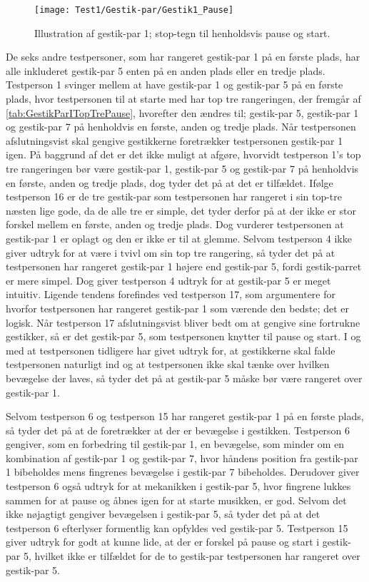 %
\begin{figure}[H]
	\centering
	\texttt{[image: Test1/Gestik-par/Gestik1\_Pause]}
	\caption{Illustration af gestik-par 1; stop-tegn til henholdsvis pause og start.}
	\label{fig:GestikPar1Pause}
\end{figure}
\noindent
% 	 
De seks andre testpersoner, som har rangeret gestik-par 1 på en første plads, har alle inkluderet gestik-par 5 enten på en anden plads eller en tredje plads. Testperson 1 svinger mellem at have gestik-par 1 og gestik-par 5 på en første plads, hvor testpersonen til at starte med har top tre rangeringen, der fremgår af \autoref{tab:GestikParITopTrePause}, hvorefter den ændres til; gestik-par 5, gestik-par 1 og gestik-par 7 på henholdvis en første, anden og tredje plads. Når testpersonen afslutningsvist skal gengive gestikkerne foretrækker testpersonen gestik-par 1 igen. På baggrund af det er det ikke muligt at afgøre, hvorvidt testperson 1's top tre rangeringen bør være gestik-par 1, gestik-par 5 og gestik-par 7 på henholdvis en første, anden og tredje plads, dog tyder det på at det er tilfældet. Ifølge testperson 16 er de tre gestik-par som testpersonen har rangeret i sin top-tre næsten lige gode, da de alle tre er simple, det tyder derfor på at der ikke er stor forskel mellem en første, anden og tredje plads. Dog vurderer testpersonen at gestik-par 1 er oplagt og den er ikke er til at glemme. Selvom testperson 4 ikke giver udtryk for at være i tvivl om sin top tre rangering, så tyder det på at testpersonen har rangeret gestik-par 1 højere end gestik-par 5, fordi gestik-parret er mere simpel. Dog giver testperson 4 udtryk for at gestik-par 5 er meget intuitiv. Ligende tendens forefindes ved testperson 17, som argumentere for hvorfor testpersonen har rangeret gestik-par 1 som værende den bedste; det er logisk. Når testperson 17 afslutningsvist bliver bedt om at gengive sine fortrukne gestikker, så er det gestik-par 5, som testpersonen knytter til pause og start. I og med at testpersonen tidligere har givet udtryk for, at gestikkerne skal falde testpersonen naturligt ind og at testpersonen ikke skal tænke over hvilken bevægelse der laves, så tyder det på at gestik-par 5 måske bør være rangeret over gestik-par 1.   

Selvom testperson 6 og testperson 15 har rangeret gestik-par 1 på en første plads, så tyder det på at de foretrækker at der er bevægelse i gestikken. Testperson 6 gengiver, som en forbedring til gestik-par 1, en bevægelse, som minder om en kombination af gestik-par 1 og gestik-par 7, hvor håndens position fra gestik-par 1 bibeholdes mens fingrenes bevægelse i gestik-par 7 bibeholdes. Derudover giver testperson 6 også udtryk for at mekanikken i gestik-par 5, hvor fingrene lukkes sammen for at pause og åbnes igen for at starte musikken, er god. Selvom det ikke nøjagtigt gengiver bevægelsen i gestik-par 5, så tyder det på at det testperson 6 efterlyser formentlig kan opfyldes ved gestik-par 5. Testperson 15 giver udtryk for godt at kunne lide, at der er forskel på pause og start i gestik-par 5, hvilket ikke er tilfældet for de to gestik-par testpersonen har rangeret over gestik-par 5. 

